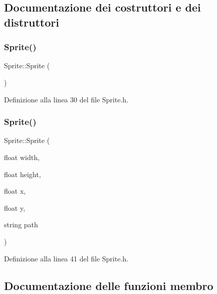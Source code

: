 \subsection{Documentazione dei costruttori e dei distruttori}
\mbox{\label{class_sprite_a12cba3ac1868418add3c4d95ce87e615}} 
\subsubsection{\texorpdfstring{Sprite()}{Sprite()}\hspace{0.1cm}{\footnotesize\ttfamily [1/2]}}
{\footnotesize\ttfamily Sprite\+::\+Sprite (\begin{DoxyParamCaption}{ }\end{DoxyParamCaption})\hspace{0.3cm}{\ttfamily [inline]}}



Definizione alla linea 30 del file Sprite.\+h.

\mbox{\label{class_sprite_a637199c9e346e719beb622761fbf6ce5}} 
\subsubsection{\texorpdfstring{Sprite()}{Sprite()}\hspace{0.1cm}{\footnotesize\ttfamily [2/2]}}
{\footnotesize\ttfamily Sprite\+::\+Sprite (\begin{DoxyParamCaption}\item[{float}]{width,  }\item[{float}]{height,  }\item[{float}]{x,  }\item[{float}]{y,  }\item[{string}]{path }\end{DoxyParamCaption})\hspace{0.3cm}{\ttfamily [inline]}}



Definizione alla linea 41 del file Sprite.\+h.



\subsection{Documentazione delle funzioni membro}
\mbox{\label{class_sprite_aad7770d311d6e4f6783206bebad9c0ad}} 
